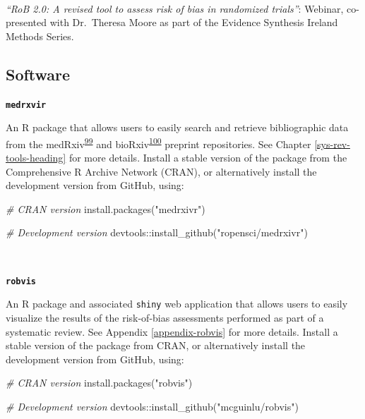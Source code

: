 \documentclass[a4paper, twoside]{templates/ociamthesis}
\newenvironment{Shaded}{\begin{snugshade}}{\end{snugshade}}
\newcommand{\CommentTok}[1]{\textcolor[rgb]{0.56,0.35,0.01}{\textit{#1}}}
\newcommand{\FunctionTok}[1]{\textcolor[rgb]{0.00,0.00,0.00}{#1}}
\newcommand{\NormalTok}[1]{#1}
\newcommand{\SpecialCharTok}[1]{\textcolor[rgb]{0.00,0.00,0.00}{#1}}
\newcommand{\StringTok}[1]{\textcolor[rgb]{0.31,0.60,0.02}{#1}}
\renewenvironment{Shaded}
{
  \vspace{4pt}%
  \begin{snugshade}%
}{%
  \end{snugshade}%
  \vspace{4pt}%
}
\begin{document}
~

\emph{``RoB 2.0: A revised tool to assess risk of bias in randomized trials''}: Webinar, co-presented with Dr.~Theresa Moore as part of the Evidence Synthesis Ireland Methods Series.

\hypertarget{outputs-software}{%
\subsection{Software}\label{outputs-software}}

\textbf{\texttt{medrxvir}}

An R package that allows users to easily search and retrieve bibliographic data from the medRxiv\textsuperscript{\protect\hyperlink{ref-rawlinson2019}{99}} and bioRxiv\textsuperscript{\protect\hyperlink{ref-sever2019}{100}} preprint repositories. See Chapter \ref{sys-rev-tools-heading} for more details. Install a stable version of the package from the Comprehensive R Archive Network (CRAN), or alternatively install the development version from GitHub, using:

\begin{Shaded}
\begin{Highlighting}[]
\CommentTok{\# CRAN version}
\FunctionTok{install.packages}\NormalTok{(}\StringTok{"medrxivr"}\NormalTok{)}

\CommentTok{\# Development version}
\NormalTok{devtools}\SpecialCharTok{::}\FunctionTok{install\_github}\NormalTok{(}\StringTok{"ropensci/medrxivr"}\NormalTok{)}
\end{Highlighting}
\end{Shaded}

~

\textbf{\texttt{robvis}}

An R package and associated \texttt{shiny} web application that allows users to easily visualize the results of the risk-of-bias assessments performed as part of a systematic review. See Appendix \ref{appendix-robvis} for more details. Install a stable version of the package from CRAN, or alternatively install the development version from GitHub, using:

\begin{Shaded}
\begin{Highlighting}[]
\CommentTok{\# CRAN version}
\FunctionTok{install.packages}\NormalTok{(}\StringTok{"robvis"}\NormalTok{)}

\CommentTok{\# Development version}
\NormalTok{devtools}\SpecialCharTok{::}\FunctionTok{install\_github}\NormalTok{(}\StringTok{"mcguinlu/robvis"}\NormalTok{)}
\end{Highlighting}
\end{Shaded}
\end{document}
